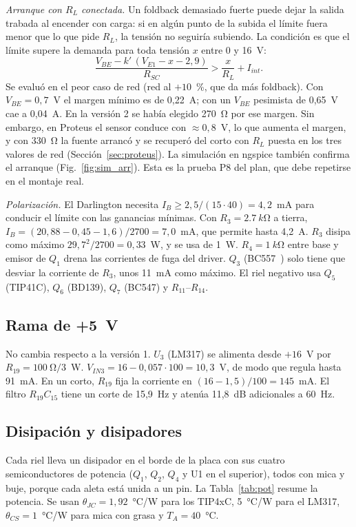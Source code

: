\documentclass[conference]{IEEEtran}
\begin{document}
\textit{Arranque con $R_L$ conectada.} Un foldback demasiado fuerte puede dejar la salida trabada al encender con carga: si en algún punto de la subida el límite fuera menor que lo que pide $R_L$, la tensión no seguiría subiendo. La condición es que el límite supere la demanda para toda tensión $x$ entre 0 y 16~V:
\begin{equation}
\frac{V_{BE}-k'\,(V_{E1}-x-2{,}9)}{R_{SC}}>\frac{x}{R_L}+I_{int}.
\end{equation}
Se evaluó en el peor caso de red (red al $+10$~\%, que da más foldback). Con $V_{BE}=0{,}7$~V el margen mínimo es de 0,22~A; con un $V_{BE}$ pesimista de 0,65~V cae a 0,04~A. En la versión 2 se había elegido \SI{270}{\ohm} por ese margen. Sin embargo, en Proteus el sensor conduce con $\approx0{,}8$~V, lo que aumenta el margen, y con \SI{330}{\ohm} la fuente arrancó y se recuperó del corto con $R_L$ puesta en los tres valores de red (Sección~\ref{sec:proteus}). La simulación en ngspice también confirma el arranque (Fig.~\ref{fig:sim_arr}). Esta es la prueba P8 del plan, que debe repetirse en el montaje real.

\textit{Polarización.} El Darlington necesita $I_B\geq2{,}5/(15\cdot40)=4{,}2$~mA para conducir el límite con las ganancias mínimas. Con $R_3=\SI{2,7}{k\ohm}$ a tierra, $I_B=(20{,}88-0{,}45-1{,}6)/2700=7{,}0$~mA, que permite hasta 4,2~A. $R_3$ disipa como máximo $29{,}7^2/2700=0{,}33$~W, y se usa de 1~W. $R_4=\SI{1}{k\ohm}$ entre base y emisor de $Q_1$ drena las corrientes de fuga del driver. $Q_3$ (BC557~\cite{bc547}) solo tiene que desviar la corriente de $R_3$, unos 11~mA como máximo. El riel negativo usa $Q_5$ (TIP41C), $Q_6$ (BD139), $Q_7$ (BC547) y $R_{11}$--$R_{14}$.

\subsection{Rama de +5~V}
No cambia respecto a la versión 1. $U_3$ (LM317) se alimenta desde $+16$~V por $R_{19}=\SI{100}{\ohm}/3$~W. $V_{IN3}=16-0{,}057\cdot100=10{,}3$~V, de modo que regula hasta 91~mA. En un corto, $R_{19}$ fija la corriente en $(16-1{,}5)/100=145$~mA. El filtro $R_{19}C_{15}$ tiene un corte de 15,9~Hz y atenúa 11,8~dB adicionales a 60~Hz.

\subsection{Disipación y disipadores}
Cada riel lleva un disipador en el borde de la placa con sus cuatro semiconductores de potencia ($Q_1$, $Q_2$, $Q_4$ y U1 en el superior), todos con mica y buje, porque cada aleta está unida a un pin. La Tabla~\ref{tab:pot} resume la potencia. Se usan $\theta_{JC}=1{,}92$~°C/W para los TIP4xC, 5~°C/W para el LM317, $\theta_{CS}=1$~°C/W para mica con grasa y $T_A=40$~°C.
\end{document}

